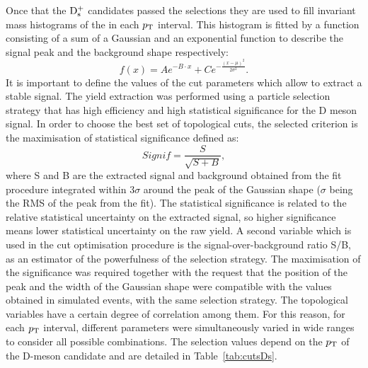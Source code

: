 Once that the ${\rm D_s^+}$ candidates passed the selections they are 
used to fill invariant mass histograms of the in each $p_{\rm T}$ interval.
This histogram is fitted by a function consisting of a sum of 
a Gaussian and an exponential function to describe the signal peak and 
the background shape respectively:
\begin{equation}
f(x)= Ae^{-B\cdot x}+Ce^{-\frac{(x-\mu)^2}{2\sigma^2}}.
\end{equation}
It is important to define the values of the cut parameters 
which allow to extract a stable signal. 
 The yield extraction was performed using a particle selection 
 strategy that has high efficiency and high statistical 
 significance for the D meson signal.
In order to choose the best set of topological cuts, 
the selected criterion is the maximisation of statistical 
significance defined as:
\[
Signif = \frac{S}{\sqrt{S+B}},
\]
where S and B are the extracted signal and background obtained 
from the fit procedure integrated within 3$\sigma$ 
around the peak of the Gaussian shape ($\sigma$ being the
RMS of the peak from the fit). The statistical significance is related to the 
relative statistical uncertainty on the extracted signal, so higher 
significance means lower statistical uncertainty on the raw yield. 
A second variable which is used in the cut optimisation procedure
 is the signal-over-background ratio S/B, as 
 an estimator of the powerfulness of the selection strategy. 
 The maximisation of the significance was required together
  with the request that the position of the peak and the width 
  of the Gaussian shape were compatible with the values
   obtained in simulated events, with the same selection strategy.
The topological variables have a certain degree of correlation among them. 
For this reason, for each $p_{\rm T}$ interval, different parameters 
were simultaneously varied in wide ranges to consider all possible combinations. 
The selection values depend on the $p_{\rm T}$ of the D-meson candidate and 
are detailed in Table~\ref{tab:cutsDs}.
